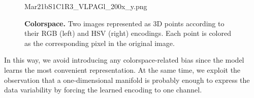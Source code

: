 \begin{figure}
    \centering
    \vspace{1.5cm}
    Mar21bS1C1R3\_VLPAGl\_200x\_y.png   
    \caption{\textbf{Colorspace.} Two images represented as 3D points according to their RGB (left) and HSV (right) encodings. 
    Each point is colored as the corresponding pixel in the original image.
    }
    \label{fig:dataset:colorspace}
\end{figure}
In this way, we avoid introducing any colorspace-related bias since the model learns the most convenient representation.
At the same time, we exploit the observation that a one-dimensional manifold is probably enough to express the data variability by forcing the learned encoding to one channel.